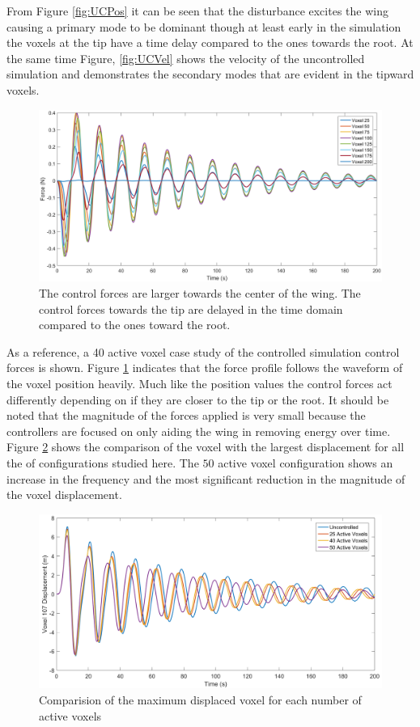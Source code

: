 \documentclass[11pt]{ucthesis}
\begin{document}
From Figure \ref{fig:UCPos} it can be seen that the disturbance excites the wing causing a primary mode to be dominant though at least early in the simulation the voxels at the tip have a time delay compared to the ones towards the root. At the same time Figure, \ref{fig:UCVel} shows the velocity of the uncontrolled simulation and demonstrates the secondary modes that are evident in the tipward voxels.

\begin{figure}[thpb]
\centering
\includegraphics[width=0.75\linewidth]{Figures/LMIControl.png}
\caption{The control forces are larger towards the center of the wing. The control forces towards the tip are delayed in the time domain compared to the ones toward the root.}
\label{fig:control}
\end{figure}

As a reference, a 40 active voxel case study of the controlled simulation control forces is shown. Figure \ref{fig:control} indicates that the force profile follows the waveform of the voxel position heavily. Much like the position values the control forces act differently depending on if they are closer to the tip or the root. It should be noted that the magnitude of the forces applied is very small because the controllers are focused on only aiding the wing in removing energy over time. Figure \ref{fig:maxVoxel} shows the comparison of the voxel with the largest displacement for all the of configurations studied here. The $50$ active voxel configuration shows an increase in the frequency and the most significant reduction in the magnitude of the voxel displacement.

\begin{figure}[thpb]
\centering
\includegraphics[width=0.75\linewidth]{Figures/LMIMaxVoxelComparison.png}
\caption{Comparision of the maximum displaced voxel for each number of active voxels}
\label{fig:maxVoxel}
\end{figure}
\end{document}
